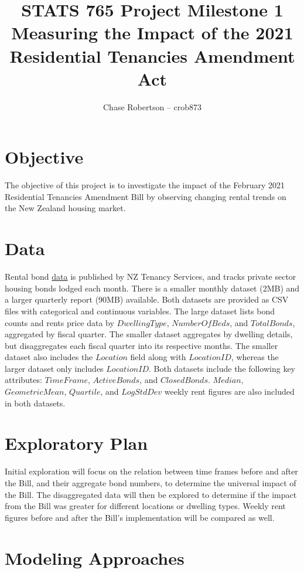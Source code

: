 \documentclass[11pt, oneside, british]{article}
\title{STATS 765 Project Milestone 1 \\ Measuring the Impact of the 2021 Residential Tenancies Amendment Act}
\author{Chase Robertson -- crob873}
\date{}						%
\begin{document}
\maketitle

\section{Objective}

The objective of this project is to investigate the impact of the February 2021 Residential Tenancies Amendment Bill by observing changing rental trends on the New Zealand housing market.

\section{Data}

Rental bond
\hyperlink{https://www.tenancy.govt.nz/about-tenancy-services/data-and-statistics/rental-bond-data}{data}
is published by NZ Tenancy Services, and tracks private sector housing bonds lodged each month. 
There is a smaller monthly dataset (2MB) and a larger quarterly report (90MB) available. 
Both datasets are provided as CSV files with categorical and continuous variables.
The large dataset lists bond counts and rents price data by $Dwelling Type$, $Number Of Beds$, and $Total Bonds$, aggregated by fiscal quarter.
The smaller dataset aggregates by dwelling details, but disaggregates each fiscal quarter into its respective months. 
The smaller dataset also includes the $Location$ field along with $Location ID$, whereas the larger dataset only includes $Location ID$.
Both datasets include the following key attributes: $Time Frame$, $Active Bonds$, and $Closed Bonds$. $Median$, $Geometric Mean$, $Quartile$, and $Log Std Dev$ weekly rent figures are also included in both datasets.

\section{Exploratory Plan}

Initial exploration will focus on the relation between time frames before and after the Bill, and their aggregate bond numbers, to determine the universal impact of the Bill.
The disaggregated data will then be explored to determine if the impact from the Bill was greater for different locations or dwelling types.
Weekly rent figures before and after the Bill's implementation will be compared as well.

\section{Modeling Approaches}
\end{document}
